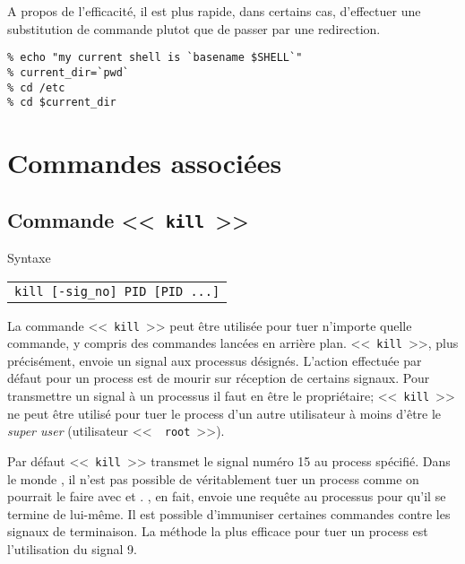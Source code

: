 A propos de l'efficacit{\'e}, il est plus rapide, dans certains cas,
d'effectuer une substitution de commande plutot que de passer par une
redirection.

\begin{example}
\begin{verbatim}
% echo "my current shell is `basename $SHELL`"
% current_dir=`pwd`
% cd /etc
% cd $current_dir
\end{verbatim}
\end{example}

\section{Commandes associ{\'e}es}

\subsection{\texorpdfstring{\label{multi-task-kill}Commande <<~{\tt kill}~>>}{Commande <<~kill~>>}}

\begin{definition}{Syntaxe}
\begin{tabular}{@{\hspace{1cm}}l}
	{\tt kill [-sig\_no] PID [PID ...]}\\[0.2cm]
\end{tabular}
\end{definition}

La commande <<~\texttt{kill}~>> peut {\^e}tre
utilis{\'e}e pour tuer n'importe quelle commande, y compris des
commandes lanc{\'e}es en arri{\`e}re plan. <<~{\tt kill}~>>, plus
pr{\'e}cis{\'e}ment, envoie un signal aux processus d{\'e}sign{\'e}s.
L'action effectu{\'e}e par d{\'e}faut pour un process est de mourir sur
r{\'e}ception de certains signaux. Pour transmettre un signal {\`a} un
processus il faut en {\^e}tre le propri{\'e}taire; <<~{\tt kill}~>> ne
peut {\^e}tre utilis{\'e} pour tuer le process d'un autre utilisateur
{\`a} moins d'{\^e}tre le {\sl super user} (utilisateur <<~{\tt
root}~>>).

Par d{\'e}faut <<~{\tt kill}~>> transmet le signal num{\'e}ro 15 au process sp{\'e}cifi{\'e}.
Dans le monde {\Unix}, il n'est pas possible de v{\'e}ritablement tuer un process
comme on pourrait le faire avec {\WindowsNT} et {\OpenVMS}. {\Unix}, en fait,
envoie une requ{\^e}te au processus pour qu'il se termine de lui-m{\^e}me. Il est
possible d'immuniser certaines commandes contre les signaux de terminaison. La
m{\'e}thode la plus efficace pour tuer un process est l'utilisation du signal 9.

